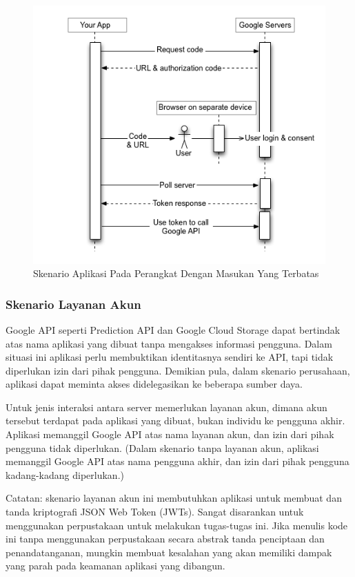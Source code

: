\begin{figure}[H]
\centering
\includegraphics[scale=1]{Gambar/skenario3.png}
\caption[Gambar Skenario Aplikasi Pada Perangkat Dengan Masukan Yang Terbatas]{Skenario Aplikasi Pada Perangkat Dengan Masukan Yang Terbatas}
\label{fig:skenarioaplikasimasukanterbatas}
\end{figure}

\subsubsection{Skenario Layanan Akun}
Google API seperti Prediction API dan Google Cloud Storage dapat bertindak atas nama aplikasi yang dibuat tanpa mengakses informasi pengguna. Dalam situasi ini aplikasi perlu membuktikan identitasnya sendiri ke API, tapi tidak diperlukan izin dari pihak pengguna. Demikian pula, dalam skenario perusahaan, aplikasi dapat meminta akses didelegasikan ke beberapa sumber daya.

Untuk jenis interaksi antara server memerlukan layanan akun, dimana akun tersebut terdapat pada aplikasi yang dibuat, bukan individu ke pengguna akhir. Aplikasi memanggil Google API atas nama layanan akun, dan izin dari pihak pengguna tidak diperlukan. (Dalam skenario tanpa layanan akun, aplikasi memanggil Google API atas nama pengguna akhir, dan izin dari pihak pengguna kadang-kadang diperlukan.)

Catatan: skenario layanan akun ini membutuhkan aplikasi untuk membuat dan tanda kriptografi JSON Web Token (JWTs). Sangat disarankan untuk menggunakan perpustakaan untuk melakukan tugas-tugas ini. Jika menulis kode ini tanpa menggunakan perpustakaan secara abstrak tanda penciptaan dan penandatanganan, mungkin membuat kesalahan yang akan memiliki dampak yang parah pada keamanan aplikasi yang dibangun.

